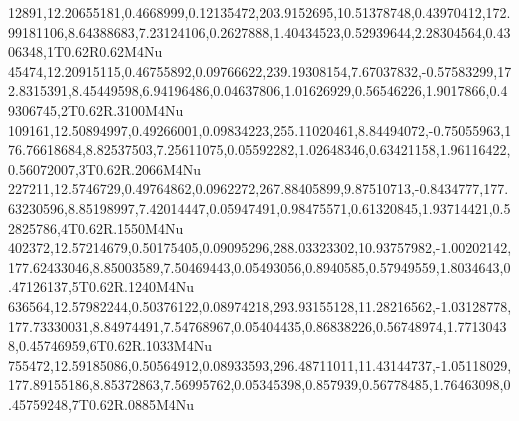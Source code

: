12891,12.20655181,0.4668999,0.12135472,203.9152695,10.51378748,0.43970412,172.99181106,8.64388683,7.23124106,0.2627888,1.40434523,0.52939644,2.28304564,0.4306348,1T0.62R0.62M4Nu
45474,12.20915115,0.46755892,0.09766622,239.19308154,7.67037832,-0.57583299,172.8315391,8.45449598,6.94196486,0.04637806,1.01626929,0.56546226,1.9017866,0.49306745,2T0.62R.3100M4Nu
109161,12.50894997,0.49266001,0.09834223,255.11020461,8.84494072,-0.75055963,176.76618684,8.82537503,7.25611075,0.05592282,1.02648346,0.63421158,1.96116422,0.56072007,3T0.62R.2066M4Nu
227211,12.5746729,0.49764862,0.0962272,267.88405899,9.87510713,-0.8434777,177.63230596,8.85198997,7.42014447,0.05947491,0.98475571,0.61320845,1.93714421,0.52825786,4T0.62R.1550M4Nu
402372,12.57214679,0.50175405,0.09095296,288.03323302,10.93757982,-1.00202142,177.62433046,8.85003589,7.50469443,0.05493056,0.8940585,0.57949559,1.8034643,0.47126137,5T0.62R.1240M4Nu
636564,12.57982244,0.50376122,0.08974218,293.93155128,11.28216562,-1.03128778,177.73330031,8.84974491,7.54768967,0.05404435,0.86838226,0.56748974,1.77130438,0.45746959,6T0.62R.1033M4Nu
755472,12.59185086,0.50564912,0.08933593,296.48711011,11.43144737,-1.05118029,177.89155186,8.85372863,7.56995762,0.05345398,0.857939,0.56778485,1.76463098,0.45759248,7T0.62R.0885M4Nu
